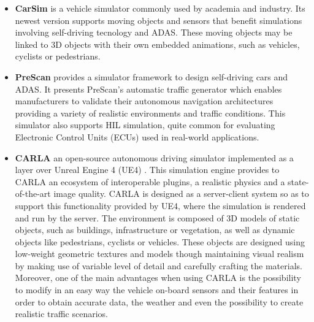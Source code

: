 \begin{itemize}
	
	
	\item \textbf{CarSim} \cite{benekohal1988carsim} is a vehicle simulator commonly used by academia and industry. Its newest version supports moving objects and sensors that benefit simulations involving self-driving tecnology and ADAS. These moving objects may be linked to 3D objects with their own embedded animations, such as vehicles, cyclists or pedestrians.
	
	\item \textbf{PreScan} \cite{tideman2013simulation} provides a simulator framework to design self-driving cars and \ac{ADAS}. It presents PreScan's automatic traffic generator which enables manufacturers to validate their autonomous navigation architectures providing a variety of realistic environments and traffic conditions. This simulator also supports HIL simulation, quite common for evaluating Electronic Control Units (ECUs) used in real-world applications.
	
	\item \textbf{\ac{CARLA}} \cite{dosovitskiy2017carla} an open-source autonomous driving simulator implemented as a layer over Unreal Engine 4 (UE4) \cite{sanders2016introduction}. This simulation engine provides to \ac{CARLA} an ecosystem of interoperable plugins, a realistic physics and a state-of-the-art image quality. \ac{CARLA} is designed as a server-client system so as to support this functionality provided by UE4, where the simulation is rendered and run by the server. The environment is composed of 3D models of static objects, such as buildings, infrastructure or vegetation, as well as dynamic objects like pedestrians, cyclists or vehicles. These objects are designed using low-weight geometric textures and models though maintaining visual realism by making use of variable level of detail and carefully crafting the materials. Moreover, one of the main advantages when using \ac{CARLA} is the possibility to modify in an easy way the vehicle on-board sensors and their features in order to obtain accurate data, the weather and even the possibility to create realistic traffic scenarios.
	

\end{itemize}
